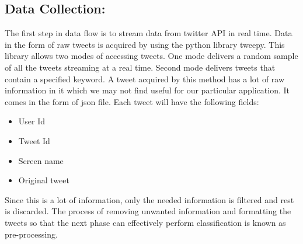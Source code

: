 \subsection{Data Collection:}
\indent 
The first step in data flow is to stream data from twitter API in real time. Data in the form of raw tweets is acquired by using the python library tweepy. This library allows two modes of accessing tweets. One mode delivers a random sample of all the tweets streaming at a real time. Second mode delivers tweets that contain a specified keyword.
A tweet acquired by this method has a lot of raw information in it which we may not find useful for our particular application. It comes in the form of json file. Each tweet will have the following fields:
\begin{itemize}
    \item User Id
    \item Tweet Id
    \item Screen name
    \item Original tweet
\end{itemize}
Since this is a lot of information, only the needed information is filtered and rest is discarded. The process of removing unwanted information and formatting the tweets so that the next phase can effectively perform classification is known as pre-processing.


